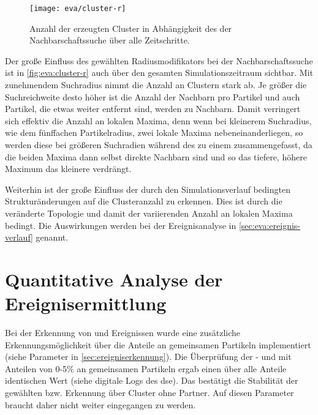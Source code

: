 \begin{figure}
	\texttt{[image: eva/cluster-r]}
	\caption{Anzahl der erzeugten Cluster in Abhängigkeit des  der Nachbarschaftssuche über alle Zeitschritte.}\label{fig:eva:cluster-r}
\end{figure}

Der große Einfluss des gewählten Radiusmodifikators bei der Nachbarschaftssuche ist in \autoref{fig:eva:cluster-r} auch über den gesamten Simulationszeitraum sichtbar. Mit zunehmendem Suchradius nimmt die Anzahl an Clustern stark ab. Je größer die Suchreichweite desto höher ist die Anzahl der Nachbarn pro Partikel und auch Partikel, die etwas weiter entfernt sind, werden zu Nachbarn. Damit verringert sich effektiv die Anzahl an lokalen Maxima, denn wenn bei kleinerem Suchradius, wie dem fünffachen Partikelradius, zwei lokale Maxima nebeneinanderliegen, so werden diese bei größeren Suchradien während des \SECC zu einem zusammengefasst, da die beiden Maxima dann selbst direkte Nachbarn sind und so das tiefere, höhere Maximum das kleinere verdrängt.

Weiterhin ist der große Einfluss der durch den Simulationsverlauf bedingten Strukturänderungen auf die Clusteranzahl zu erkennen. Dies ist durch die veränderte Topologie und damit der variierenden Anzahl an lokalen Maxima bedingt. Die Auswirkungen werden bei der Ereignisanalyse in \autoref{sec:eva:ereignis-verlauf} genannt.

\section{Quantitative Analyse der Ereignisermittlung}\label{eva:quantitativ}

Bei der Erkennung von  und  Ereignissen wurde eine zusätzliche Erkennungsmöglichkeit über die Anteile an gemeinsamen Partikeln implementiert (siehe Parameter in \autoref{sec:ereigniserkennung}). Die Überprüfung der - und  mit Anteilen von 0-5\% an gemeinsamen Partikeln ergab einen über alle Anteile identischen Wert (siehe digitale Logs des \gls{dse}). Das bestätigt die Stabilität der gewählten  bzw.  Erkennung über Cluster ohne Partner. Auf diesen Parameter braucht daher nicht weiter eingegangen zu werden.

